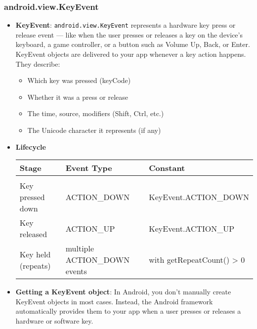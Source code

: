 \documentclass{report}
\begin{document}

    \pagebreak 
    \subsubsection{android.view.KeyEvent}
    \begin{itemize}
        \item \textbf{KeyEvent}: \texttt{android.view.KeyEvent} represents a hardware key press or release event — like when the user presses or releases a key on the device’s keyboard, a game controller, or a button such as Volume Up, Back, or Enter.
            \bigbreak \noindent 
            KeyEvent objects are delivered to your app whenever a key action happens.
            \bigbreak \noindent 
            They describe:
            \begin{itemize}
                \item Which key was pressed (keyCode)
                \item Whether it was a press or release
                \item The time, source, modifiers (Shift, Ctrl, etc.)
                \item The Unicode character it represents (if any)
            \end{itemize}
        \item \textbf{Lifecycle}
            \begin{center}
                \begin{tabular}{p{4cm}|p{4cm}|p{4cm}}
                    Stage	&Event Type	&Constant \\
                    \hline \\[0.01cm]
                    Key pressed down	&ACTION\_DOWN	&KeyEvent.ACTION\_DOWN \\[2ex]
                    Key released	&ACTION\_UP	&KeyEvent.ACTION\_UP \\[2ex]
                    Key held (repeats)	&multiple ACTION\_DOWN events	&with getRepeatCount() > 0
                \end{tabular}
            \end{center}
        \item \textbf{Getting a KeyEvent object}: In Android, you don’t manually create KeyEvent objects in most cases. Instead, the Android framework automatically provides them to your app when a user presses or releases a hardware or software key.

\end{itemize}
\end{document}
